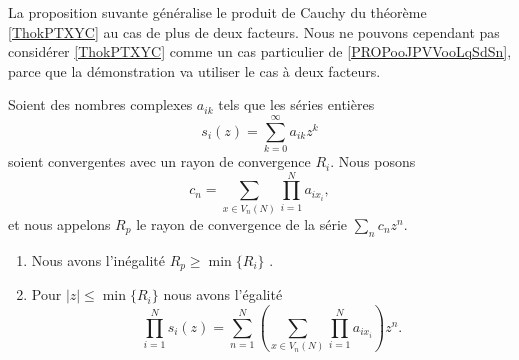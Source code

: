 La proposition suvante généralise le produit de Cauchy du théorème \ref{ThokPTXYC} au cas de plus de deux facteurs. Nous ne pouvons cependant pas considérer \ref{ThokPTXYC} comme un cas particulier de \ref{PROPooJPVVooLqSdSn}, parce que la démonstration va utiliser le cas à deux facteurs.
\begin{proposition}     \label{PROPooJPVVooLqSdSn}
	Soient des nombres complexes \( a_{ik}\) tels que les séries entières
	\begin{equation}
		s_i(z)=\sum_{k=0}^{\infty}a_{ik}z^k
	\end{equation}
	soient convergentes avec un rayon de convergence \( R_i\). Nous posons
	\begin{equation}
		c_n=\sum_{x\in V_n(N)}\prod_{i=1}^Na_{ix_i},
	\end{equation}
	et nous appelons \( R_p\) le rayon de convergence de la série \( \sum_nc_nz^n\).
	\begin{enumerate}
		\item
		      Nous avons l'inégalité \( R_p\geq \min\{R_i\}\) .
		\item       \label{ITEMooUVNXooLxlawx}
		      Pour \( | z |\leq \min\{R_i\}\) nous avons l'égalité
		      \begin{equation}        \label{EQooHCUGooDRhxzt}
			      \prod_{i=1}^Ns_i(z)=\sum_{n=1}^N\left( \sum_{x\in V_n(N)}\prod_{i=1}^Na_{ix_i} \right)z^n.
		      \end{equation}
	\end{enumerate}
\end{proposition}

